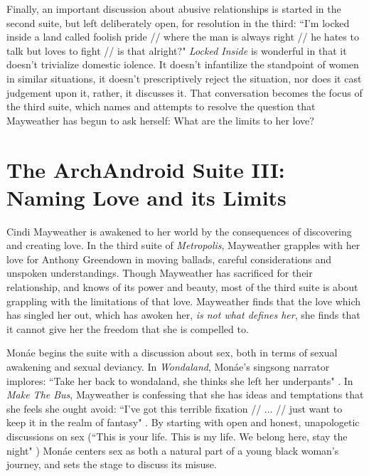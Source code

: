 \documentclass[a4paper, 11pt]{article} %
\begin{document}
Finally, an important discussion about abusive relationships is started in the second suite, but left deliberately open, for resolution in the third:
``I'm locked inside a land called foolish pride // where the man is always right // he hates to talk but loves to fight // is that alright?" \cite{lockedinside}
\emph{Locked Inside} is wonderful in that it doesn't trivialize domestic iolence. 
It doesn't infantilize the standpoint of women in similar situations, it doesn't prescriptively reject the situation, nor does it cast judgement upon it, rather, it discusses it.
That conversation becomes the focus of the third suite, which names and attempts to resolve the question that Mayweather has begun to ask herself:
What are the limits to her love?


\section*{The ArchAndroid Suite III: Naming Love and its Limits}

Cindi Mayweather is awakened to her world by the consequences of discovering and creating love.
In the third suite of \emph{Metropolis}, Mayweather grapples with her love for Anthony Greendown in moving ballads, careful considerations and unspoken understandings.
Though Mayweather has sacrificed for their relationship, and knows of its power and beauty, most of the third suite is about grappling with the limitations of that love.
Mayweather finds that the love which has singled her out, which has awoken her, \emph{is not what defines her}, she finds that it cannot give her the freedom that she is compelled to.

Mon\'ae begins the suite with a discussion about sex, both in terms of sexual awakening and sexual deviancy.
In \emph{Wondaland}, Mon\'ae's singsong narrator implores: ``Take her back to wondaland, she thinks she left her underpants" \cite{wondaland}.
In \emph{Make The Bus}, Mayweather is confessing that she has ideas and temptations that she feels she ought avoid:
``I've got this terrible fixation // ... // just want to keep it in the realm of fantasy" \cite{makethebus}.
By starting with open and honest, unapologetic discussions on sex (``This is your life. This is my life. We belong here, stay the night" \cite{wondaland}) 
Mon\'ae centers sex as both a natural part of a young black woman's journey, and sets the stage to discuss its misuse.
\end{document}
